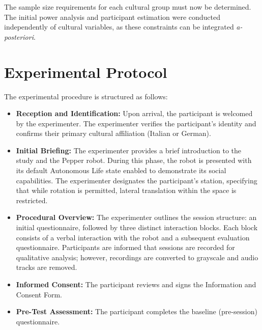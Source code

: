 The sample size requirements for each cultural group must now be determined. 
The initial power analysis and participant estimation were conducted independently of cultural variables, as these constraints can be integrated \textit{a-posteriori}.


\section{Experimental Protocol}

The experimental procedure is structured as follows:

\begin{itemize}
\item \textbf{Reception and Identification:} Upon arrival, the participant is welcomed by the experimenter. 
The experimenter verifies the participant's identity and confirms their primary cultural affiliation (Italian or German).

\item \textbf{Initial Briefing:} The experimenter provides a brief introduction to the study and the Pepper robot. 
During this phase, the robot is presented with its default Autonomous Life state enabled to demonstrate its social capabilities. 
The experimenter designates the participant's station, specifying that while rotation is permitted, lateral translation within the space is restricted.

\item \textbf{Procedural Overview:} The experimenter outlines the session structure: an initial questionnaire, followed by three distinct interaction blocks. Each block consists of a verbal interaction with the robot and a subsequent evaluation questionnaire. 
Participants are informed that sessions are recorded for qualitative analysis; however, recordings are converted to grayscale and audio tracks are removed.

\item \textbf{Informed Consent:} The participant reviews and signs the Information and Consent Form.

\item \textbf{Pre-Test Assessment:} The participant completes the baseline (pre-session) questionnaire.


\end{itemize}
